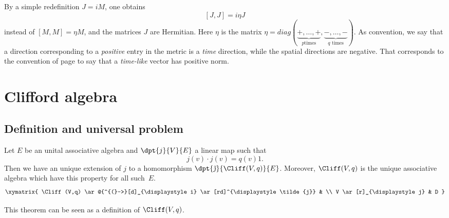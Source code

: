 By a simple redefinition $J=iM$, one obtains
\begin{equation}            \label{EqJJietaJcomm}
    [J,J]=i\eta J
\end{equation}
instead of $[M,M]=\eta M$, and the matrices $J$ are Hermitian. Here $\eta$ is the matrix $\eta=diag(\underbrace{+,\ldots,+}_{p \text{times}},\underbrace{-,\ldots,-}_{\text{$q$ times}})$. As convention, we say that a direction corresponding to a \emph{positive} entry in the metric is a \emph{time} direction, while the spatial directions are negative. That corresponds to the convention of page \pageref{PgDefsGenre} to say that a \emph{time-like} vector has positive norm.

\section{Clifford algebra}

\subsection{Definition and universal problem}


\begin{theorem}
Let $E$ be an unital associative algebra and $\dpt{j}{V}{E}$ a linear map such that
\begin{equation}
    j(v)\cdot j(v)=q(v)1.        \label{102r1}
\end{equation}
Then we have an unique extension of $j$ to a homomorphism $\dpt{\tilde\jmath}{\Cliff(V,q)}{E}$. Moreover, $\Cliff(V,q)$ is the unique associative algebra which have this property for all such~$E$.
\[
\xymatrix{
    \Cliff(V,q) \ar@{^{(}->}[d]_{\displaystyle i} \ar[rd]^{\displaystyle\tilde{j}} &  \\
    V \ar[r]_{\displaystyle j} & D
  }
\]
\label{tho_Cliffunif}
\end{theorem}
This theorem can be seen as a definition of $\Cliff(V,q)$.

